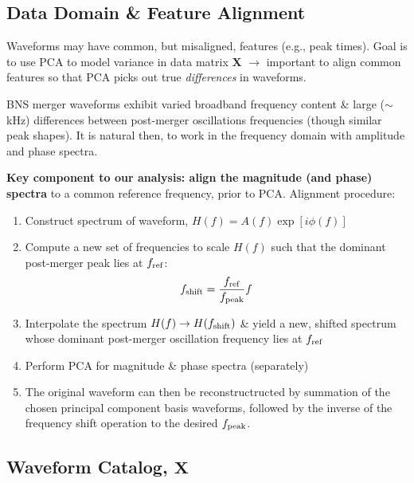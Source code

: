\documentclass[a0,landscape]{a0poster}
\newcommand{\matr}[1]{\mathbf{#1}}
\begin{document}
\begin{multicols}{4}
\subsection*{\centering Data Domain \& Feature Alignment}
Waveforms may have common, but misaligned, features (e.g., peak times).  Goal is
to use PCA to model variance in data matrix $\matr{X}$ $\rightarrow$ important
to align common features so that PCA picks out true \emph{differences} in
waveforms.

BNS merger waveforms exhibit varied broadband frequency content \& large
($\sim$\,kHz) differences between post-merger oscillations frequencies (though
similar peak shapes).  It is natural then, to work in the frequency domain with
amplitude and phase spectra.

{\bf Key component to our analysis: align the magnitude (and phase) spectra} to
a common reference frequency, prior to PCA.   Alignment procedure:
\begin{enumerate}
    \item Construct spectrum of waveform, $H(f) = A(f)\exp[i\phi(f)]$
    \item Compute a new set of frequencies to scale $H(f)$ such that the
        dominant post-merger peak lies at $f_{\rm ref}$:
        \begin{equation}
            f_{\rm shift} = \frac{f_{\rm ref}}{f_{\rm peak}}  f
        \end{equation}
    \item Interpolate the spectrum $H(f)\rightarrow H(f_{\rm shift})$ \& yield a
        new, shifted spectrum whose dominant post-merger oscillation frequency
        lies at $f_{\rm ref}$
    \item Perform PCA for magnitude \& phase spectra (separately)
    \item The original waveform can then be reconstructructed by summation of
        the chosen principal component basis waveforms, followed by the inverse
        of the frequency shift operation to the desired $f_{\rm peak}$.
\end{enumerate}

\subsection*{\centering Waveform Catalog, $\matr{X}$}


\end{multicols}
\end{document}
